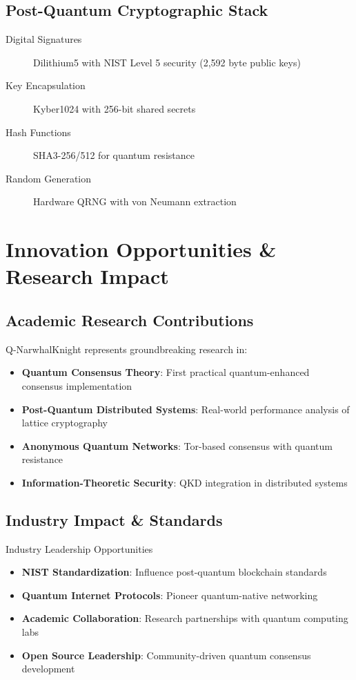 \documentclass[11pt,a4paper]{article}
\begin{document}
\subsection{Post-Quantum Cryptographic Stack}

\begin{description}
\item[Digital Signatures] Dilithium5 with NIST Level 5 security (2,592 byte public keys)
\item[Key Encapsulation] Kyber1024 with 256-bit shared secrets
\item[Hash Functions] SHA3-256/512 for quantum resistance
\item[Random Generation] Hardware QRNG with von Neumann extraction
\end{description}

\section{Innovation Opportunities \& Research Impact}

\subsection{Academic Research Contributions}

Q-NarwhalKnight represents groundbreaking research in:

\begin{itemize}
\item \textbf{Quantum Consensus Theory}: First practical quantum-enhanced consensus implementation
\item \textbf{Post-Quantum Distributed Systems}: Real-world performance analysis of lattice cryptography
\item \textbf{Anonymous Quantum Networks}: Tor-based consensus with quantum resistance
\item \textbf{Information-Theoretic Security}: QKD integration in distributed systems
\end{itemize}

\subsection{Industry Impact \& Standards}

\begin{achievementbox}{Industry Leadership Opportunities}
\begin{itemize}
\item \textbf{NIST Standardization}: Influence post-quantum blockchain standards
\item \textbf{Quantum Internet Protocols}: Pioneer quantum-native networking
\item \textbf{Academic Collaboration}: Research partnerships with quantum computing labs
\item \textbf{Open Source Leadership}: Community-driven quantum consensus development
\end{itemize}
\end{achievementbox}
\end{document}
